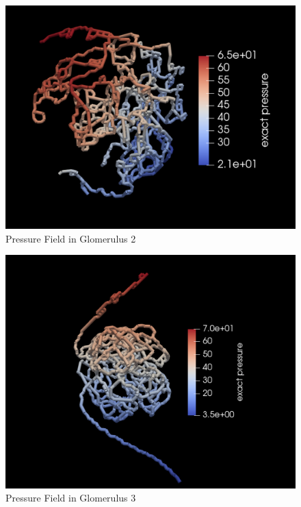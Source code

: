 \begin{figure}[h]
\centering
\includegraphics[width=162mm]{glom2_pressure2}
\caption{Pressure Field in Glomerulus 2}
\label{fig:glom2_pressure2}
\end{figure}
\begin{figure}[h]
\centering
\includegraphics[width=162mm]{glom3_pressure}
\caption{Pressure Field in Glomerulus 3}
\label{fig:glom3_pressure}
\end{figure}
